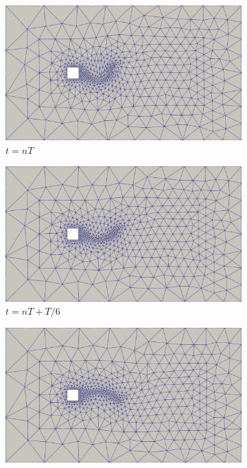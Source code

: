 \begin{figure}[h!]
    \centering
    \caption{\textit{Flutter} em painel - Caso 1 - Configurações da malha obtidas no problema.}
    \begin{subfigure}[b]{0.49\textwidth}
        \includegraphics[width=\linewidth]{Figuras/FSI-prism/mT1.png}
        \caption{$t=nT$}
    \end{subfigure}
    \begin{subfigure}[b]{0.49\textwidth}
        \includegraphics[width=\linewidth]{Figuras/FSI-prism/mT2.png}
        \caption{$t=nT+T/6$}
    \end{subfigure}
    \begin{subfigure}[b]{0.49\textwidth}
        \includegraphics[width=\linewidth]{Figuras/FSI-prism/mT3.png}

\end{subfigure}
\end{figure}
